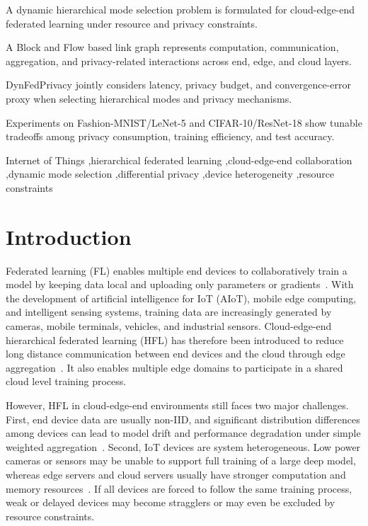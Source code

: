 ﻿\documentclass[preprint,12pt]{elsarticle}
\theoremstyle{plain}
\theoremstyle{definition}
\theoremstyle{remark}
\begin{document}
\begin{frontmatter}
\begin{highlights}
\item A dynamic hierarchical mode selection problem is formulated for cloud-edge-end federated learning under resource and privacy constraints.
\item A Block and Flow based link graph represents computation, communication, aggregation, and privacy-related interactions across end, edge, and cloud layers.
\item DynFedPrivacy jointly considers latency, privacy budget, and convergence-error proxy when selecting hierarchical modes and privacy mechanisms.
\item Experiments on Fashion-MNIST/LeNet-5 and CIFAR-10/ResNet-18 show tunable tradeoffs among privacy consumption, training efficiency, and test accuracy.
\end{highlights}

\begin{keyword}
Internet of Things \sep hierarchical federated learning \sep cloud-edge-end collaboration \sep dynamic mode selection \sep differential privacy \sep device heterogeneity \sep resource constraints
\end{keyword}

\end{frontmatter}
\section{Introduction}
\label{sec:introduction}
Federated learning (FL) enables multiple end devices to collaboratively train a model by keeping data local and uploading only parameters or gradients~\cite{fedavg}.
With the development of artificial intelligence for IoT (AIoT), mobile edge computing, and intelligent sensing systems, training data are increasingly generated by cameras, mobile terminals, vehicles, and industrial sensors.
Cloud-edge-end hierarchical federated learning (HFL) has therefore been introduced to reduce long distance communication between end devices and the cloud through edge aggregation~\cite{hfl}.
It also enables multiple edge domains to participate in a shared cloud level training process.

However, HFL in cloud-edge-end environments still faces two major challenges.
First, end device data are usually non-IID, and significant distribution differences among devices can lead to model drift and performance degradation under simple weighted aggregation~\cite{fedavgm,fedprox}.
Second, IoT devices are system heterogeneous.
Low power cameras or sensors may be unable to support full training of a large deep model, whereas edge servers and cloud servers usually have stronger computation and memory resources~\cite{wang2019adaptivefl}.
If all devices are forced to follow the same training process, weak or delayed devices may become stragglers or may even be excluded by resource constraints.
\end{document}
